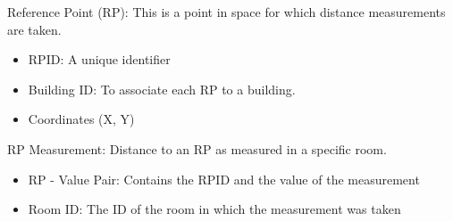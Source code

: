 Reference Point (RP): This is a point in space for which distance measurements are taken.
\begin{itemize}
	\item RPID: A unique identifier
	\item Building ID: To associate each RP to a building.
	\item Coordinates (X, Y)
\end{itemize}

RP Measurement: Distance to an RP as measured in a specific room.
\begin{itemize}
	\item RP - Value Pair: Contains the RPID and the value of the measurement
	\item Room ID: The ID of the room in which the measurement was taken
\end{itemize}

